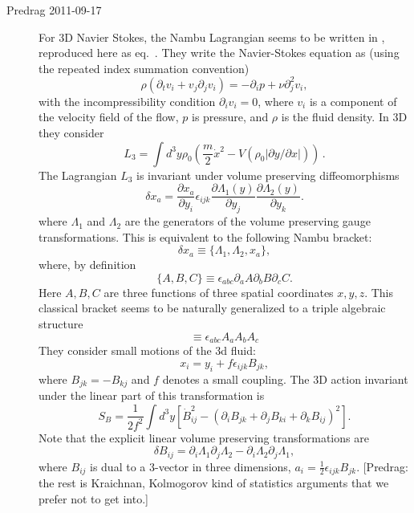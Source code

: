 \begin{description}
\item[Predrag 2011-09-17 ]
For 3D Navier Stokes, the Nambu Lagrangian seems to be written in
, reproduced here as eq.~.
They write the Navier-Stokes equation as (using the repeated index summation convention)
\begin{equation}
\rho (\partial_t v_i + v_j \partial_j v_i) = - \partial_i p + \nu \partial_j^2 v_i,
\end{equation}
with the incompressibility condition $\partial_i v_i = 0$, where $v_i$ is
a component of the velocity field of the flow, $p$ is pressure, and
$\rho$ is the fluid density. In 3D they consider
\begin{equation}
L_3= \int d^3y \rho_0
\left( \frac{m}{2} \dot{x}^2 - V( \rho_0 |{ \partial y}/{\partial x}|) \right)
\,.
\label{MiPlSt11:Lagr}
\end{equation}
The Lagrangian $L_3$ is invariant under volume preserving diffeomorphisms
\begin{equation}
\delta x_a = \frac{\partial x_a}{\partial y_i}\epsilon_{ijk} \frac{\partial \Lambda_1(y)}{\partial y_j}
\frac{\partial \Lambda_2(y)}{\partial y_k}.
\end{equation}
where $\Lambda_1$ and $\Lambda_2$ are the generators of the volume preserving
gauge transformations.
This is equivalent to the following Nambu bracket:
\begin{equation}
\delta x_a \equiv \{\Lambda_1, \Lambda_2, x_a\},
\end{equation}
where, by definition
\begin{equation}
\{A, B, C\}\equiv \epsilon_{abc} \partial_a A \partial_b B \partial_c C.
\end{equation}
Here $A,B,C$ are three functions of three spatial coordinates $x,y,z$.
This classical bracket seems to be naturally generalized to a triple
algebraic structure %
\begin{equation}
[A_i, A_j, A_k] \equiv \epsilon_{abc} A_a A_b A_c
\end{equation}
They consider small motions of the 3d fluid:
\begin{equation}
x_i = y_i + f \epsilon_{ijk} B_{jk},
\end{equation}
where $B_{jk}= - B_{kj}$ and $f$ denotes a small coupling.
The 3D action invariant under the linear part of this transformation is
\begin{equation}
S_B = \frac{1}{2 f^2}  \int d^3y [  \dot{B}_{ij}^2 - (\partial_i B_{jk} +\partial_j B_{ki} +\partial_k B_{ij})^2].
\end{equation}
Note that the explicit linear volume preserving transformations are
\begin{equation}
\delta B_{ij} = \partial_i \Lambda_1 \partial_j \Lambda_2 - \partial_i \Lambda_2
\partial_j \Lambda_1,
\end{equation}
where $B_{ij}$  is dual to a 3-vector in three dimensions,
$
a_i = \frac{1}{2} \epsilon_{ijk} B_{jk}
$.
[Predrag: the rest is Kraichnan, Kolmogorov kind of statistics arguments that
we prefer not to get into.]


\end{description}
